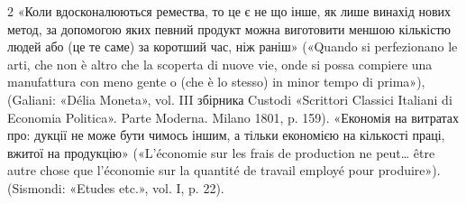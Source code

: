 2 «Коли вдосконалюються ремества, то це є не що інше, як лише
винахід нових метод, за допомогою яких певний продукт можна виготовити
меншою кількістю людей або (це те саме) за коротший час, ніж
раніш» («Quando si perfezionano le arti, che non è altro che la scoperta
di nuove vie, onde si possa compiere una manufattura con meno gente o
(che è lo stesso) in minor tempo di prima»), (Galiani: «Délia Moneta»,
vol. III збірника Custodi «Scrittori Classici Italiani di Economia Politica».
Parte Moderna. Milano 1801, p. 159). «Економія на витратах про:
дукції не може бути чимось іншим, а тільки економією на кількості
праці, вжитої на продукцію» («L'économie sur les frais de production
ne peut\dots{} être autre chose que l’économie sur la quantité de travail employé
pour produire»). (Sismondi: «Etudes etc.», vol. I, p. 22).
\parbreak{}  %
